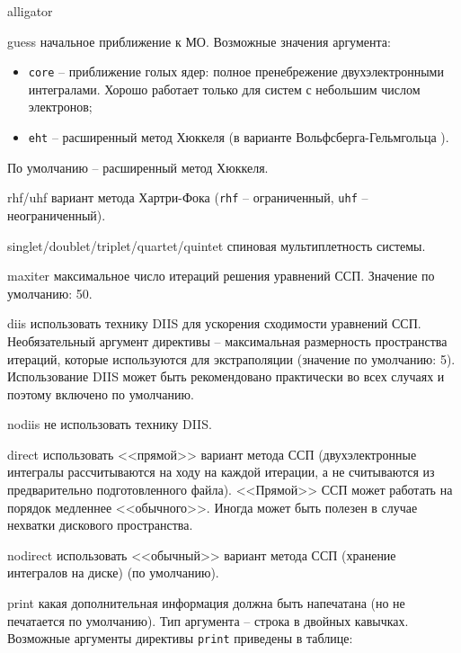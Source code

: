 \documentclass[a4paper, 12pt]{article}
\begin{document}
\begin{labeling}{alligator}
\item [guess] начальное приближение к МО. Возможные значения аргумента:
	\begin{itemize}
	\item \texttt{core} -- приближение голых ядер: полное пренебрежение двухэлектронными интегралами. Хорошо работает только для систем с небольшим числом электронов;
	\item \texttt{eht} -- расширенный метод Хюккеля \cite{hoffmann1963} (в варианте Вольфс\-берга-Гельмгольца \cite{wolfsberg1952}).
	\end{itemize}
    По умолчанию -- расширенный метод Хюккеля.
\item [rhf/uhf] вариант метода Хартри-Фока (\texttt{rhf} -- ограниченный, \texttt{uhf} -- неограниченный).
\item [singlet/doublet/triplet/quartet/quintet] спиновая мультиплетность системы.
\item [maxiter] максимальное число итераций решения уравнений ССП. Значение по умолчанию: 50.
\item [diis] использовать технику DIIS \cite{pulay1980,pulay1981} для ускорения сходимости уравнений ССП. Необязательный аргумент директивы -- максимальная размерность пространства итераций, которые используются для экстраполяции (значение по умолчанию: 5). Использование DIIS может быть рекомендовано практически во всех случаях и поэтому включено по умолчанию.
\item [nodiis] не использовать технику DIIS.
\item [direct] использовать <<прямой>> вариант метода ССП (двухэлектронные интегралы рассчитываются на ходу на каждой итерации, а не считываются из предварительно подготовленного файла). <<Прямой>> ССП может работать на порядок медленнее <<обычного>>. Иногда может быть полезен в случае нехватки дискового пространства.
\item [nodirect] использовать <<обычный>> вариант метода ССП (хранение интегралов на диске) (по умолчанию).
\item [print] какая дополнительная информация должна быть напечатана (но не печатается по умолчанию). Тип аргумента -- строка в двойных кавычках. Возможные аргументы директивы \texttt{print} приведены в таблице:


\end{labeling}
\end{document}
